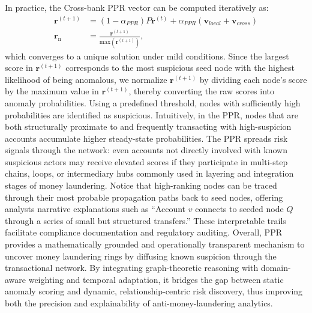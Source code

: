 \documentclass[11pt,english]{article}
\begin{document}
In practice, the Cross-bank PPR vector can be computed iteratively as:
\begin{align}
    \boldsymbol{r}^{(t+1)} &= (1 - \alpha_{PPR})P \boldsymbol{r}^{(t)} + \alpha_{PPR} (\boldsymbol{v}_{local} + \boldsymbol{v}_{cross})  \\
    \boldsymbol{r}_{\text{n}} &= \frac{\boldsymbol{r}^{(t+1)}}{\text{max}(\boldsymbol{r}^{(t+1)})}, 
\end{align}
which converges to a unique solution under mild conditions. Since the largest score in $\boldsymbol{r}^{(t+1)}$ corresponds to the most suspicious seed node with the highest likelihood of being anomalous, we normalize $\boldsymbol{r}^{(t+1)}$ by dividing each node’s score by the maximum value in $\boldsymbol{r}^{(t+1)}$, thereby converting the raw scores into anomaly probabilities. Using a predefined threshold, nodes with sufficiently high probabilities are identified as suspicious. Intuitively, in the PPR, nodes that are both structurally proximate to and frequently transacting with high-suspicion accounts accumulate higher steady-state probabilities. The PPR spreads risk signals through the network: even accounts not directly involved with known suspicious actors may receive elevated scores if they participate in multi-step chains, loops, or intermediary hubs commonly used in layering and integration stages of money laundering. Notice that high-ranking nodes can be traced through their most probable propagation paths back to seed nodes, offering analysts narrative explanations such as “Account $v$ connects to seeded node $Q$ through a series of small but structured transfers.” These interpretable trails facilitate compliance documentation and regulatory auditing. 
Overall, PPR provides a mathematically grounded and operationally transparent mechanism to uncover money laundering rings by diffusing known suspicion through the transactional network. By integrating graph-theoretic reasoning with domain-aware weighting and temporal adaptation, it bridges the gap between static anomaly scoring and dynamic, relationship-centric risk discovery, thus improving both the precision and explainability of anti-money-laundering analytics.
 
\end{document}
